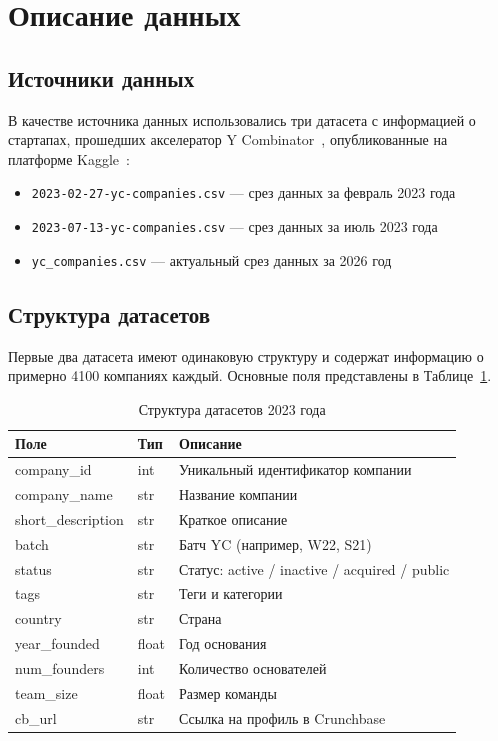 \newpage

\section{Описание данных}

\subsection{Источники данных}

В качестве источника данных использовались три датасета с информацией о стартапах, прошедших акселератор Y Combinator~\cite{ycombinator}, опубликованные на платформе Kaggle~\cite{kaggle-yc-dataset}:

\begin{itemize}
    \item \texttt{2023-02-27-yc-companies.csv} --- срез данных за февраль 2023 года
    \item \texttt{2023-07-13-yc-companies.csv} --- срез данных за июль 2023 года
    \item \texttt{yc\_companies.csv} --- актуальный срез данных за 2026 год
\end{itemize}

\subsection{Структура датасетов}

Первые два датасета имеют одинаковую структуру и содержат информацию о примерно 4100 компаниях каждый. Основные поля представлены в Таблице~\ref{tab:ds12}.

\begin{table}[htbp]
\centering
\small
\caption{Структура датасетов 2023 года}
\label{tab:ds12}
\begin{tabular}{@{}l l p{8cm}@{}}
\toprule
\textbf{Поле} & \textbf{Тип} & \textbf{Описание} \\
\midrule
company\_id & int & Уникальный идентификатор компании \\
company\_name & str & Название компании \\
short\_description & str & Краткое описание \\
batch & str & Батч YC (например, W22, S21) \\
status & str & Статус: active / inactive / acquired / public \\
tags & str & Теги и категории \\
country & str & Страна \\
year\_founded & float & Год основания \\
num\_founders & int & Количество основателей \\
team\_size & float & Размер команды \\
cb\_url & str & Ссылка на профиль в Crunchbase \\
\bottomrule
\end{tabular}
\end{table}


